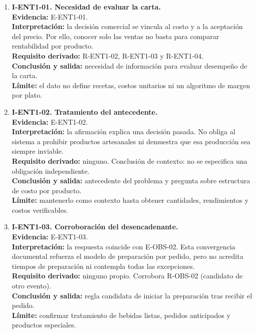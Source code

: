 \begin{enumerate}
  \item \textbf{I-ENT1-01. Necesidad de evaluar la carta.}\\
  \textbf{Evidencia:} E-ENT1-01.\\
  \textbf{Interpretación:} la decisión comercial se vincula al costo y a la
  aceptación del precio. Por ello, conocer solo las ventas no basta para
  comparar rentabilidad por producto.\\
  \textbf{Requisito derivado:} R-ENT1-02, R-ENT1-03 y R-ENT1-04.\\
  \textbf{Conclusión y salida:} necesidad de información para evaluar
  desempeño de la carta.\\
  \textbf{Límite:} el dato no define recetas, costos unitarios ni un
  algoritmo de margen por plato.

  \item \textbf{I-ENT1-02. Tratamiento del antecedente.}\\
  \textbf{Evidencia:} E-ENT1-02.\\
  \textbf{Interpretación:} la afirmación explica una decisión pasada. No
  obliga al sistema a prohibir productos artesanales ni demuestra que esa
  producción sea siempre inviable.\\
  \textbf{Requisito derivado:} ninguno. Conclusión de contexto: no se
  especifica una obligación independiente.\\
  \textbf{Conclusión y salida:} antecedente del problema y pregunta sobre
  estructura de costo por producto.\\
  \textbf{Límite:} mantenerlo como contexto hasta obtener cantidades,
  rendimientos y costos verificables.

  \item \textbf{I-ENT1-03. Corroboración del desencadenante.}\\
  \textbf{Evidencia:} E-ENT1-03.\\
  \textbf{Interpretación:} la respuesta coincide con E-OBS-02. Esta
  convergencia documental refuerza el modelo de preparación por pedido, pero
  no acredita tiempos de preparación ni contempla todas las excepciones.\\
  \textbf{Requisito derivado:} ninguno propio. Corrobora R-OBS-02
  (candidato de otro evento).\\
  \textbf{Conclusión y salida:} regla candidata de iniciar la preparación
  tras recibir el pedido.\\
  \textbf{Límite:} confirmar tratamiento de bebidas listas, pedidos
  anticipados y productos especiales.


\end{enumerate}
